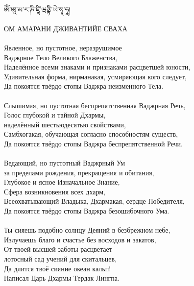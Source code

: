 \newpage
{}
\Vspace{1cm}
\ti
\\
ཨོཾ་ཨཱ་མ་ར་ཎི་ཛཱི་ཝནྟི་ཡེ་སྭཱ་ཧཱ། \\
\ru \\ ОМ АМАРАНИ ДЖИВАНТИЙЕ СВАХА\\
\\
Явленное, но пустотное, неразрушимое \\ \indent Ваджрное Тело Великого Блаженства,\\
Наделённое всеми знаками и признаками расцветшей юности,\\
Удивительная форма, нирманакая, усмиряющая кого следует,\\
Да покоятся твёрдо стопы Ваджра неизменного Тела.\\
\\
Слышимая, но пустотная беспрепятственная Ваджрная Речь,\\
Голос глубокой и тайной Дхармы, \\ \indent наделённый шестьюдесятью свойствами,\\
Самбхогакая, обучающая согласно способностям существ,\\
Да покоятся твёрдо стопы Ваджра беспрепятственной Речи.\\
\\
Ведающий, но пустотный Ваджрный Ум \\ \indent за пределами рождения, прекращения и обитания,\\
Глубокое и ясное Изначальное Знание, \\ \indent Сфера возникновения всех дхарм,\\
Всеохватывающий Владыка, Дхармакая, сердце Победителя,\\
Да покоятся твёрдо стопы Ваджра безошибочного Ума.\\
\\
Ты сияешь подобно солнцу Деяний в безбрежном небе,\\
Излучаешь благо и счастье без восходов и закатов,\\
От твоей высшей заботы расцветает \\ \indent лотосный сад учений для скитальцев,\\
Да длится твоё сияние океан кальп!\\
\scriptsize
Написал Царь Дхармы Тердак Лингпа.
\normalsize
\newpage

